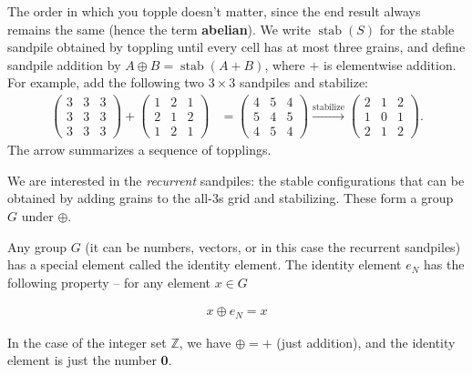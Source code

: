 \documentclass[11pt]{article}
\newcommand{\1}{ \mathbb{1} }
\begin{document}
The order in which you topple doesn't matter, since the end result always
remains the same (hence the term \textbf{abelian}). We write
$\operatorname{stab}(S)$ for the stable sandpile obtained by toppling until
every cell has at most three grains, and define sandpile addition by
$A \oplus B = \operatorname{stab}(A+B)$, where $+$ is elementwise addition.
For example, add the following two $3 \times 3$ sandpiles and stabilize:
\begin{align*}
  \begin{pmatrix} 3 & 3 & 3 \\ 3 & 3 & 3 \\ 3 & 3 & 3 \end{pmatrix}
  +
  \begin{pmatrix} 1 & 2 & 1 \\ 2 & 1 & 2 \\ 1 & 2 & 1 \end{pmatrix}
  &=
  \begin{pmatrix} 4 & 5 & 4 \\ 5 & 4 & 5 \\ 4 & 5 & 4 \end{pmatrix}
  \xrightarrow{\text{stabilize}}
  \begin{pmatrix} 2 & 1 & 2 \\ 1 & 0 & 1 \\ 2 & 1 & 2 \end{pmatrix}.
\end{align*}
The arrow summarizes a sequence of topplings.

We are interested in the \textit{recurrent} sandpiles: the stable configurations
that can be obtained by adding grains to the all-3s grid and stabilizing.
These form a group $G$ under $\oplus$. 

Any group $G$ (it can be numbers, vectors, or in this case the recurrent
sandpiles) has a special element called the identity element. The identity
element $e_N$ has the following property -- for any element $x \in G$ 

\begin{align*}
  x \oplus e_N = x
\end{align*}

In the case of the integer set $\mathbb{Z}$, we have $\oplus = + $ (just addition), and
the identity element is just the number \textbf{0}.
\end{document}
